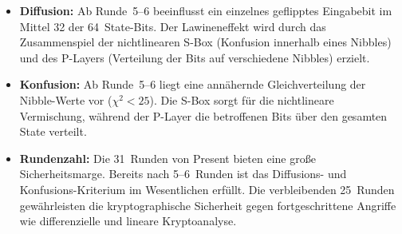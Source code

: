 \documentclass[
    fontsize=12pt,          %
    paper=a4,               %
    numbers=noenddot,       %
    listof=totoc,           %
    listof=entryprefix,     %
    listof=nochaptergap,    %
    bibliography=totoc,     %
    parskip=half,           %
    openany                 %
]{scrbook}
\begin{document}
\begin{itemize}
    \item \textbf{Diffusion:} Ab Runde~5--6 beeinflusst ein einzelnes geflipptes Eingabebit im Mittel 32 der 64~State-Bits.
    Der Lawineneffekt wird durch das Zusammenspiel der nichtlinearen S-Box (Konfusion innerhalb eines Nibbles) und des P-Layers (Verteilung der Bits auf verschiedene Nibbles) erzielt.

    \item \textbf{Konfusion:} Ab Runde~5--6 liegt eine annähernde Gleichverteilung der Nibble-Werte vor ($\chi^2 < 25$).
    Die S-Box sorgt für die nichtlineare Vermischung, während der P-Layer die betroffenen Bits über den gesamten State verteilt.

    \item \textbf{Rundenzahl:} Die 31~Runden von Present bieten eine große Sicherheitsmarge.
    Bereits nach 5--6~Runden ist das Diffusions- und Konfusions-Kriterium im Wesentlichen erfüllt.
    Die verbleibenden 25~Runden gewährleisten die kryptographische Sicherheit gegen fortgeschrittene Angriffe wie differenzielle und lineare Kryptoanalyse.
\end{itemize}

\end{document}
